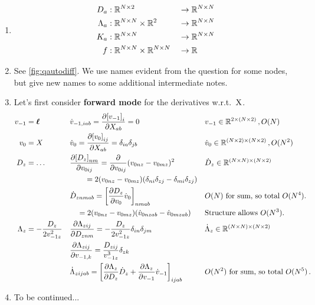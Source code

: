 \begin{enumerate}[label=\alph*.]
\item
\begin{align}
D_a &: \mathbb{R}^{N\times 2} &&\to \mathbb{R}^{N\times N} \\
\Lambda_a &: \mathbb{R}^{N\times N}\times \mathbb{R}^{2} &&\to \mathbb{R}^{N\times N} \\
K_a &: \mathbb{R}^{N\times N} &&\to \mathbb{R}^{N\times N} \\
f &: \mathbb{R}^{N\times N}\times\mathbb{R}^{N\times N} &&\to \mathbb{R}
\end{align}
\item See \cref{fig:qautodiff}. We use names evident from the question for some nodes, but give new names to some additional intermediate notes.
\item Let's first consider \textbf{forward mode} for the derivatives w.r.t.~${\mathrm{{X}}}$.
\begin{align}
v_{-1} &= \boldsymbol \ell && \dot v_{-1,iab} = \pderiv[{[v_{-1}]}_{i}]{X_{ab}} = 0 && v_{-1} \in \Reals^{2 \times (N\times 2)}\,, O(N) \\ %
v_0 &= X && \dot v_0 = \pderiv[{[v_0]}_{ij}]{X_{ab}} = \delta_{ia}\delta_{jb}  &&  \dot v_0 \in \Reals^{(N\times 2)\times (N\times 2)}\,, O(N^2) \\
D_z &= \dots && \pderiv[{[D_z]}_{nm}]{v_{0ij}} = \pderiv{v_{0ij}} (v_{0nz} - v_{0mz})^2 &&  \dot D_z \in \Reals^{(N\times N) \times (N\times 2)}  \nonumber \\
& && \qquad = 2(v_{0nz} - v_{0mz})(\delta_{ni}\delta_{zj} - \delta_{mi}\delta_{zj}) &&\\
& && \dot D_{znmab} = \left[\pderiv[D_z]{v_0} \dot v_0\right]_{nmab} && O(N) \text{ for sum, so total } O(N^4). \\
& && \quad = 2 (v_{0nz} - v_{0mz}) (\dot v_{0nzab} - \dot v_{0mzab})&& \text{Structure allows } O(N^3). \\
\Lambda_z &= - \frac{D_z}{2v_{-1z}^2} && \pderiv[\Lambda_{zij}]{D_{znm}} = - \frac{D_z}{2v_{-1z}^2}\delta_{in}\delta_{jm}  && \dot \Lambda_z \in \Reals^{(N\times N) \times (N\times 2)} \\
& && \pderiv[\Lambda_{zij}]{v_{-1,k}} = \frac{D_{zij}}{v_{-1z}^3} \delta_{zk} && \\
& && \dot \Lambda_{zijab} = \left[\pderiv[\Lambda_{z}]{D_{z}} \dot D_{z} + \pderiv[\Lambda_{z}]{v_{-1}} \dot v_{-1}\right]_{ijab} && O(N^2)\text{ for sum, so total }O(N^5)\,.
\end{align}
\item {\color{red} To be continued...}
\end{enumerate}

